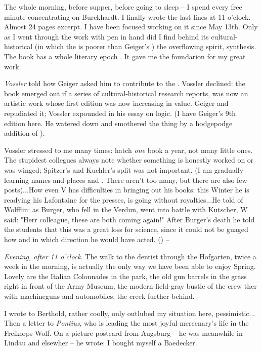 
The whole morning, before supper, before going to sleep -- I spend every free minute concentrating on Burckhardt. I finally wrote the last lines at 11 o'clock. Almost 24 pages excerpt. I have been focused working on it since May 13th. Only as I went through the work with pen in hand did I find behind its cultural-historical  (in which the  is poorer than Geiger's ) the overflowing spirit,  synthesis. The book has a whole literary epoch . It gave me the foundarion for my great work.

\textit{Vossler} told how Geiger asked him to contribute to the . Vossler declined: the book emerged out if a series of cultural-historical research reports, was now an artistic work whose first edition was now increasing in value. Geiger  and repudiated it; Vossler expounded in his essay on logic. (I have Geiger's 9th edition here. He watered down and smothered the thing by a hodgepodge addition of ).

Vossler stressed to me many times: hatch \textit{one} book a year, not many little ones. The stupidest collegues always note whether something is honestly worked on or was winged; Spitzer's and Kuchler's split was not important. (I am gradually learning names and places and . There aren't too many, but there are also few posts)...How even V has difficulties in bringing out his books: this Winter he is readying his Lafontaine for the presses, is going without royalties...He told of Wolfflin: as Burger, who fell in the Verdun, went into battle with Kutscher, W said: "Herr colleague, these are both coming again!" After Burger's death he told the students that this was a great loss for science, since it could not be guaged how and in which direction he would have acted. () --

\missing

\textit{Evening, after 11 o'clock}. The walk to the dentist through the Hofgarten, twice a week in the morning, is actually the only way we have been able to enjoy Spring. Lovely are the Italian Colonnades in the park, the old gun barrels in the grass right in front of the Army Museum, the modern field-gray bustle of the crew ther with machineguns and automobiles, the creek further behind. -- \missing

I wrote to Berthold, rather coolly, only outlubed my situation here, pessimistic... Then a letter to \textit{Pontius}, who is leading the most joyful mercenary's life in the Freikorps Wolf. On a picture postcard from Augsburg -- he was meanwhile in Lindau and elsewher -- he wrote: I bought myself a Baedecker.

\missing




